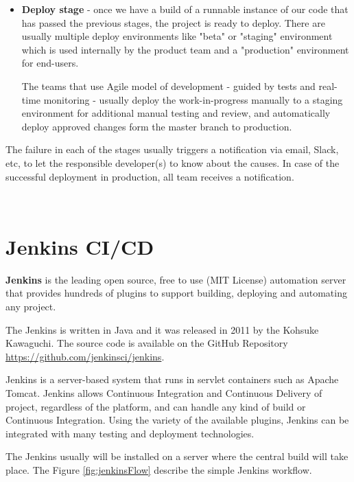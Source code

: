 \documentclass[12pt,a4paper,twoside]{article}
\begin{document}
\begin{itemize}
	\item \textbf{Deploy stage} - once we have a build of a runnable instance of our code that has passed the previous stages, the project is ready to deploy. There are usually multiple deploy environments like "beta" or "staging" environment which is used internally by the product team and a "production" environment for end-users.

The teams that use Agile model of development - guided by tests and real-time monitoring - usually deploy the work-in-progress manually to a staging environment for additional manual testing and review, and automatically deploy approved changes form the master branch to production.
\end{itemize}

The failure in each of the stages usually triggers a notification via email, Slack, etc, to let the responsible developer(s) to know about the causes. In case of the successful deployment in production, all team receives a notification.



~\newpage


\section{Jenkins CI/CD}


\textbf{Jenkins} is the leading open source, free to use (MIT License) automation server that provides hundreds of plugins to support building, deploying and automating any project. 

The Jenkins is written in Java and it was released in 2011 by the Kohsuke Kawaguchi. The source code is available on the GitHub Repository \url{https://github.com/jenkinsci/jenkins}.

Jenkins is a server-based system that runs in servlet containers such as Apache Tomcat. Jenkins allows Continuous Integration and Continuous Delivery of project, regardless of the platform, and can handle any kind of build or Continuous Integration. Using the variety of the available plugins, Jenkins can be integrated with many testing and deployment technologies.


The Jenkins usually will be installed on a server where the central build will take place. The Figure \ref{fig:jenkinsFlow} describe the simple Jenkins workflow.
\end{document}
